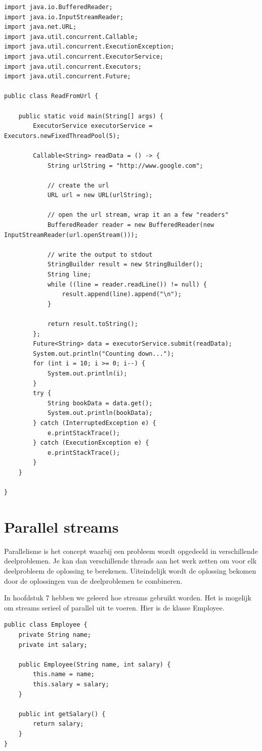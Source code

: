 \documentclass{tstextbook}
\begin{document}
\begin{lstlisting}
import java.io.BufferedReader;
import java.io.InputStreamReader;
import java.net.URL;
import java.util.concurrent.Callable;
import java.util.concurrent.ExecutionException;
import java.util.concurrent.ExecutorService;
import java.util.concurrent.Executors;
import java.util.concurrent.Future;

public class ReadFromUrl {

	public static void main(String[] args) {
		ExecutorService executorService = Executors.newFixedThreadPool(5);

		Callable<String> readData = () -> {
			String urlString = "http://www.google.com";

			// create the url
			URL url = new URL(urlString);

			// open the url stream, wrap it an a few "readers"
			BufferedReader reader = new BufferedReader(new InputStreamReader(url.openStream()));

			// write the output to stdout
			StringBuilder result = new StringBuilder();
			String line;
			while ((line = reader.readLine()) != null) {
				result.append(line).append("\n");
			}

			return result.toString();
		};
		Future<String> data = executorService.submit(readData);
		System.out.println("Counting down...");
		for (int i = 10; i >= 0; i--) {
			System.out.println(i);
		}
		try {
			String bookData = data.get();
			System.out.println(bookData);
		} catch (InterruptedException e) {
			e.printStackTrace();
		} catch (ExecutionException e) {
			e.printStackTrace();
		}
	}

}
\end{lstlisting}


\section{Parallel streams}

Parallelisme is het concept waarbij een probleem wordt opgedeeld in verschillende deelproblemen. Je kan dan verschillende threads aan het werk zetten om voor elk deelprobleem de oplossing te berekenen. Uiteindelijk wordt de oplossing bekomen door de oplossingen van de deelproblemen te combineren. 

In hoofdstuk 7 hebben we geleerd hoe streams gebruikt worden. Het is mogelijk om streams serieel of parallel uit te voeren. Hier is de klasse Employee.

\begin{lstlisting}
public class Employee {
	private String name;
	private int salary;

	public Employee(String name, int salary) {
		this.name = name;
		this.salary = salary;
	}

	public int getSalary() {
		return salary;
	}
}
\end{lstlisting}
\end{document}
